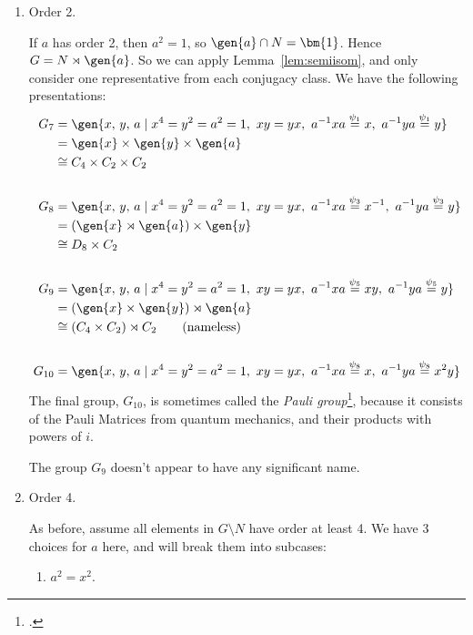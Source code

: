 \begin{enumerate}
    \item Order 2.

        If \(a\) has order 2, then \(a^2 = 1\), so \(\gen{a} \cap N = \bm{1}\).
        Hence \(G = N \rtimes \gen{a}\).
        So we can apply Lemma~\ref{lem:semiisom}, and only consider one representative from each conjugacy class.
        We have the following presentations:
        \begin{align*}
            G_7 &= \gen{x,\,y,\,a \mid x^4 = y^2 = a^2 = 1,\ xy = yx,\ a^{-1}xa \overset{\psi_1}{=} x,\ a^{-1}ya \overset{\psi_1}{=} y} \\
                &= \gen{x} \times \gen{y} \times \gen{a} \\
                &\cong C_4 \times C_2 \times C_2 \\
                & \\
            G_8 &= \gen{x,\,y,\,a \mid x^4 = y^2 = a^2 = 1,\ xy = yx,\ a^{-1}xa \overset{\psi_3}{=} x^{-1},\ a^{-1}ya \overset{\psi_3}{=} y} \\
                &= (\gen{x} \rtimes \gen{a}) \times \gen{y} \\
                &\cong D_8 \times C_2 \\
                & \\
            G_9 &= \gen{x,\,y,\,a \mid x^4 = y^2 = a^2 = 1,\ xy = yx,\ a^{-1}xa \overset{\psi_5}{=} xy,\ a^{-1}ya \overset{\psi_5}{=} y} \\
                &= (\gen{x} \times \gen{y}) \rtimes \gen{a} \\
                &\cong (C_4 \times C_2) \rtimes C_2 \tag{nameless} \\
                & \\
            G_{10} &= \gen{x,\,y,\,a \mid x^4 = y^2 = a^2 = 1,\ xy = yx,\ a^{-1}xa \overset{\psi_8}{=} x,\ a^{-1}ya \overset{\psi_8}{=} x^2 y}\\
        \end{align*}
        The final group, \(G_{10}\), is sometimes called the \emph{Pauli group}\footcite{order16names}, because it
        consists of the Pauli Matrices from quantum mechanics, and their products with powers of \(i\).

        The group \(G_9\) doesn't appear to have any significant name.
    \item Order 4.

        As before, assume all elements in \(G\setminus N\) have order at least 4.
        We have 3 choices for \(a\) here, and will break them into subcases:
        \begin{enumerate}[\bfseries A:]
            \item \(a^2 = x^2\).


\end{enumerate}
\end{enumerate}

